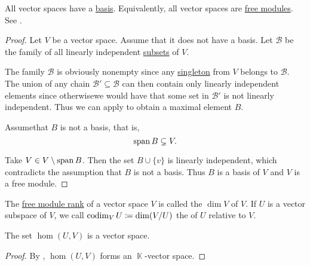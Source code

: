 \begin{theorem}\label{thm:all_vector_spaces_are_free_left_modules}
  All vector spaces have a \hyperref[def:left_module_hamel_basis]{basis}. Equivalently, all vector spaces are \hyperref[def:free_left_module]{free modules}. See .
\end{theorem}
\begin{proof}
  Let \( V \) be a vector space. Assume that it does not have a basis. Let \( \mathcal{B} \) be the family of all linearly independent \hyperref[def:linear_combination]{subsets} of \( V \).

  The family \( \mathcal{B} \) is obviously nonempty since any \hyperref[rem:singleton_sets]{singleton} from \( V \) belongs to \( \mathcal{B} \). The union of any chain \( \mathcal{B}' \subseteq \mathcal{B} \) can then contain only linearly independent elements since otherwise\DNE we would have that some set in \( \mathcal{B}' \) is not linearly independent. Thus we can apply  to obtain a maximal element \( B \).

  Assume\DNE that \( B \) is not a basis, that is,
  \begin{equation*}
    \operatorname{span} B \subsetneq V.
  \end{equation*}

  Take \( V \in V \setminus \operatorname{span} B \). Then the set \( B \cup \{ v \} \) is linearly independent, which contradicts the assumption that \( B \) is not a basis. Thus \( B \) is a basis of \( V \) and \( V \) is a free module.
\end{proof}

\begin{definition}\label{def:vector_space_dimension}
  The \hyperref[def:free_left_module]{free module rank} of a vector space \( V \) is called the  \( \dim V \) of \( V \). If \( U \) is a vector subspace of \( V \), we call \( \operatorname*{co\negthinspace\dim}_V U \coloneqq \dim(V/U) \) the  of \( U \) relative to \( V \).
\end{definition}

\begin{proposition}\label{thm:linear_maps_form_algebra}
  The set \( \hom(U, V) \) is a vector space.
\end{proposition}
\begin{proof}
  By , \( \hom(U, V) \) forms an \( \BbbK \)-vector space.
\end{proof}

